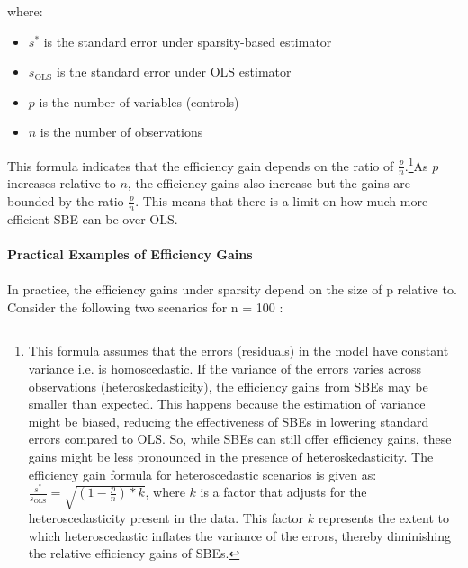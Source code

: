 where:
\begin{itemize}
    \item $s^*$ is the standard error under sparsity-based estimator
    \item $s_\text{OLS}$ is the standard error under OLS estimator
    \item $p$ is the number of variables (controls) 
    \item $n$ is the number of observations
\end{itemize}
This formula indicates that the efficiency gain depends on the ratio of $\frac{p}{n}$.\footnote{This formula assumes that the errors (residuals) in the model have constant variance i.e. is homoscedastic. If the variance of the errors varies across observations (heteroskedasticity), the efficiency gains from SBEs may be smaller than expected. This happens because the estimation of variance might be biased, reducing the effectiveness of SBEs in lowering standard errors compared to OLS. So, while SBEs can still offer efficiency gains, these gains might be less pronounced in the presence of heteroskedasticity. The efficiency gain formula for heteroscedastic scenarios is given as:$\frac{s^*}{s_{\text{OLS}}} = \sqrt{(1 - \frac{p}{n})*k}$, where $k$ is a factor that adjusts for the heteroscedasticity present in the data. This factor $k$ represents the extent to which heteroscedastic inflates the variance of the errors, thereby diminishing the relative efficiency gains of SBEs.}As $p$ increases relative to $n$, the efficiency gains also increase but the gains are bounded by the ratio $\frac{p}{n}$. This means that there is a limit on how much more efficient SBE can be over OLS. 
\\
\\
\textbf{Practical Examples of Efficiency Gains}\\
\\
In practice, the efficiency gains under sparsity depend on the size of  p  relative to. Consider the following two scenarios for  n = 100 :
